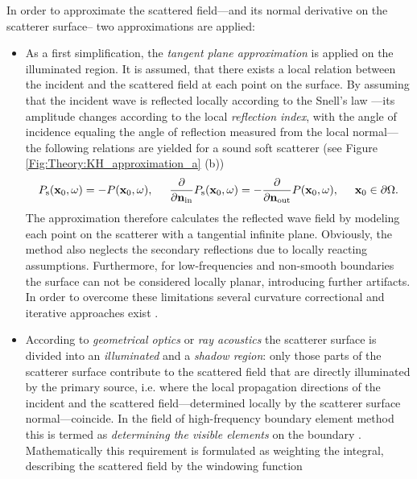 In order to approximate the scattered field---and its normal derivative on the scatterer surface-- two approximations are applied:
\begin{itemize}
\item As a first simplification, the \emph{tangent plane approximation} is applied on the illuminated region.
It is assumed, that there exists a local relation between the incident and the scattered field at each point on the surface.
By assuming that the incident wave is reflected locally according to the Snell's law  \cite{Voronich2007}---its amplitude changes according to the local \emph{reflection index}, with the angle of incidence equaling the angle of reflection measured from the local normal---the following relations are yielded for a sound soft scatterer \cite{Bleistein1984, Bleistein2000, Pike2002} (see Figure \ref{Fig:Theory:KH_approximation_a} (b))
\begin{equation}
P_{\mathrm{s}}(\mathbf{x}_0,\omega) = -P(\mathbf{x}_0,\omega), \hspace{5mm} \frac{\partial}{\partial \mathbf{n}_{\mathrm{in}}} P_{\mathrm{s}}(\mathbf{x}_0,\omega) = -\frac{\partial}{\partial \mathbf{n}_{\mathrm{out}}} P(\mathbf{x}_0,\omega), \hspace{5mm} \mathbf{x}_0 \in \partial \Omega.
\label{Eq:SFS_theory:tangent_plane}
\end{equation}
The approximation therefore calculates the reflected wave field by modeling each point on the scatterer with a tangential infinite plane. 
Obviously, the method also neglects the secondary reflections due to locally reacting assumptions. Furthermore, for low-frequencies and non-smooth boundaries the surface can not be considered locally planar, introducing further artifacts. 
In order to overcome these limitations several curvature correctional and iterative approaches exist \cite{Elfouhaily2004}.
%
\item According to \emph{geometrical optics} or \emph{ray acoustics} the scatterer surface is divided into an \emph{illuminated} and a \emph{shadow region}: only those parts of the scatterer surface contribute to the scattered field that are directly illuminated by the primary source, i.e. where the local propagation directions of the incident and the scattered field---determined locally by the scatterer surface normal---coincide.
In the field of high-frequency boundary element method this is termed as \emph{determining the visible elements} on the boundary \cite{Herrin2003}.
Mathematically this requirement is formulated as weighting the integral, describing the scattered field by the windowing function
\begin{equation}

\end{equation}
\end{itemize}

